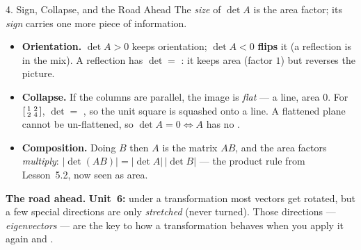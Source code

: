 \documentclass[10pt]{article}
\begin{document}
\begin{notesbox}{4. Sign, Collapse, and the Road Ahead}
The \emph{size} of $\det A$ is the area factor; its \emph{sign} carries one more piece of information.
\begin{itemize}\setlength{\itemsep}{3pt}
  \item \textbf{Orientation.} $\det A>0$ keeps orientation; $\det A<0$ \textbf{flips} it (a reflection is
        in the mix). A reflection has $\det=$ : it keeps area (factor $1$) but reverses the picture.
  \item \textbf{Collapse.} If the columns are parallel, the image is \emph{flat} --- a line, area $0$. For
        $\begin{bsmallmatrix} 1 & 2 \\ 2 & 4 \end{bsmallmatrix}$, $\det=$ , so the unit square
        is squashed onto a line. A flattened plane cannot be un-flattened, so $\det A=0\Leftrightarrow A$ has no .
  \item \textbf{Composition.} Doing $B$ then $A$ is the matrix $AB$, and the area factors \emph{multiply}:
        $|\det(AB)|=|\det A|\,|\det B|$ --- the product rule from Lesson~5.2, now seen as area.
\end{itemize}
\vspace{2pt}
\textbf{The road ahead.} \textbf{Unit~6:} under a transformation most vectors get rotated, but a few
special directions are only \emph{stretched} (never turned). Those directions --- \emph{eigenvectors} ---
are the key to how a transformation behaves when you apply it again and .
\end{notesbox}
\end{document}
